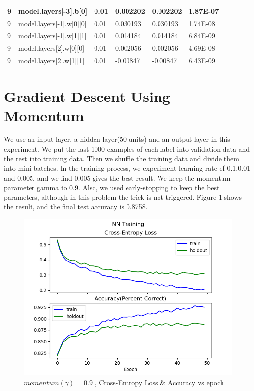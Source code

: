 \documentclass{article} %
\begin{document}
\begin{table}[]
\begin{tabular}{|l|l|l|l|l|l|}
9              & model.layers{[}-3{]}.b{[}0{]}        & 0.01             & 0.002202          & 0.002202        & 1.87E-07       \\ \hline
9              & model.layers{[}-1{]}.w{[}0{]}{[}0{]} & 0.01             & 0.030193          & 0.030193        & 1.74E-08       \\ \hline
9              & model.layers{[}-1{]}.w{[}1{]}{[}1{]} & 0.01             & 0.014184          & 0.014184        & 6.84E-09       \\ \hline
9              & model.layers{[}2{]}.w{[}0{]}{[}0{]}  & 0.01             & 0.002056          & 0.002056        & 4.69E-08       \\ \hline
9              & model.layers{[}2{]}.w{[}1{]}{[}1{]}  & 0.01             & -0.00847          & -0.00847        & 6.43E-09       \\ \hline
\end{tabular}
\end{table}
\section{Gradient Descent Using Momentum}
We use an input layer, a hidden layer(50 units) and an output layer in this experiment. We put the last 1000 examples of each label into validation data and the rest into training data. Then we shuffle the training data and divide them into mini-batches. In the training process, we experiment learning rate of 0.1,0.01 and 0.005, and we find 0.005 gives the best result. We keep the momentum parameter gamma to 0.9. Also, we used early-stopping to keep the best parameters, although in this problem the trick is not triggered.
Figure 1 shows the result, and the final test accuracy is 0.8758.\\
\begin{figure}[h]	
	\centering
	\includegraphics[scale=0.5]{./plots/Training.png}
	\caption{$momentum(\gamma) = 0.9$ , Cross-Entropy Loss \& Accuracy vs epoch}
\end{figure}
\end{document}
